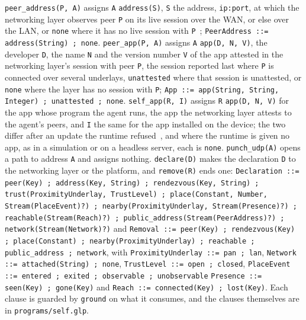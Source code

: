 \verb|peer_address(P, A)| assigns \verb|A| \verb|address(S)|, \verb|S| the address, \verb|ip:port|, at which the networking layer observes peer \verb|P| on its live session over the WAN, or else over the LAN, or \verb|none| where it has no live session with \verb|P|~\cite{bachar2026networking}; \verb|PeerAddress ::= address(String) ; none|. \verb|peer_app(P, A)| assigns \verb|A| \verb|app(D, N, V)|, the developer \verb|D|, the name \verb|N| and the version number \verb|V| of the app attested in the networking layer's session with peer \verb|P|, the session reported last where \verb|P| is connected over several underlays, \verb|unattested| where that session is unattested, or \verb|none| where the layer has no session with \verb|P|; \verb|App ::= app(String, String, Integer) ; unattested ; none|.  \verb|self_app(R, I)| assigns \verb|R| \verb|app(D, N, V)| for the app whose program the agent runs, the app the networking layer attests to the agent's peers, and \verb|I| the same for the app installed on the device; the two differ after an update the runtime refused~\cite{shapiro2026implementing}, and where the runtime is given no app, as in a simulation or on a headless server, each is \verb|none|. \verb|punch_udp(A)| opens a path to address \verb|A| and assigns nothing. \verb|declare(D)| makes the declaration \verb|D| to the networking layer or the platform, and \verb|remove(R)| ends one: \verb|Declaration ::= peer(Key) ; address(Key, String) ; rendezvous(Key, String) ; trust(ProximityUnderlay, TrustLevel) ; place(Constant, Number, Stream(PlaceEvent)?) ; nearby(ProximityUnderlay, Stream(Presence)?) ; reachable(Stream(Reach)?) ; public_address(Stream(PeerAddress)?) ; network(Stream(Network)?)| and \verb|Removal ::= peer(Key) ; rendezvous(Key) ; place(Constant) ; nearby(ProximityUnderlay) ; reachable ; public_address ; network|, with \verb|ProximityUnderlay ::= pan ; lan|, \verb|Network ::= attached(String) ; none|, \verb|TrustLevel ::= open ; closed|, \verb|PlaceEvent ::= entered ; exited ; observable ; unobservable| \verb|Presence ::= seen(Key) ; gone(Key)| and \verb|Reach ::= connected(Key) ; lost(Key)|. Each clause is guarded by \verb|ground| on what it consumes, and the clauses themselves are in \verb|programs/self.glp|.

